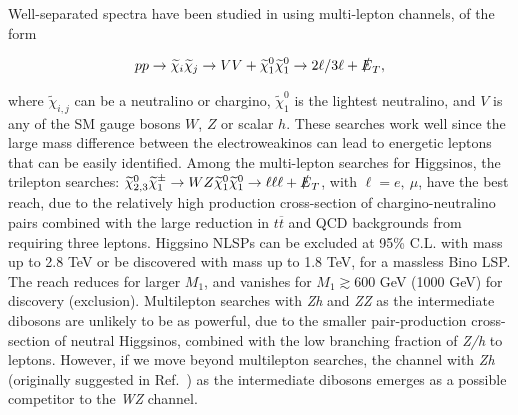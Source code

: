 \documentclass[a4paper,11pt]{article}
\newcommand{\N}{\widetilde{\chi}^0}
\newcommand{\C}{\widetilde{\chi}^\pm}
\newcommand{\met}{{\slashed{E}_T}}
\begin{document}
Well-separated spectra have been studied in \cite{Gori:2014oua,
Acharya:2014pua} using multi-lepton channels, of the form 

\begin{align}
  pp\rightarrow \widetilde{\chi}_i\widetilde{\chi}_j\rightarrow VV +
  \N_1\N_1\rightarrow 2\ell/3\ell + \met,
\end{align} 

\noindent where $\widetilde{\chi}_{i,j}$ can be a neutralino or chargino, $\N_1$
is the lightest neutralino, and $V$ is any of the SM gauge bosons $W$, $Z$
or scalar $h$.  These searches work well since the large mass difference
between the electroweakinos can lead to energetic leptons that can be easily
identified. Among the multi-lepton searches for Higgsinos, the trilepton
searches: $\N_{2,3}\C_1\rightarrow WZ\N_1\N_1\rightarrow \ell\ell\ell +
\met$, with $\ell=e, \ \mu$,  have the best reach, due to the relatively high
production cross-section of chargino-neutralino pairs combined with the large
reduction in $t\overline{t}$ and QCD backgrounds from requiring three
leptons.  Higgsino NLSPs can be excluded at 95\% C.L. with mass up to 2.8 TeV
or be discovered with  mass up to 1.8 TeV, for a massless Bino LSP.   The reach
reduces for larger $M_1$, and vanishes for $M_1\gtrsim 600$ GeV (1000 GeV)
for discovery (exclusion).  Multilepton searches with \emph{Zh} and \emph{ZZ}
as the intermediate dibosons are unlikely to be as powerful, due to the smaller
pair-production cross-section of neutral Higgsinos, combined with the low
branching fraction of \emph{Z/h} to leptons. However, if we move beyond
multilepton searches, the channel with \emph{Zh} (originally suggested in
Ref.~\cite{Han:2013kza}) as the intermediate dibosons emerges as a possible
competitor to the \emph{WZ} channel.  
\end{document}
